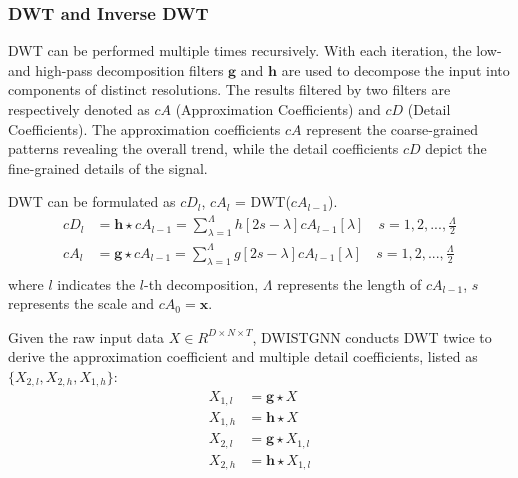\documentclass[final,12pt]{elsarticle}
\begin{document}
\subsubsection{DWT and Inverse DWT}
\label{subsubsec-4.2.1}


DWT can be performed multiple times recursively.
With each iteration, 
the low- and high-pass decomposition filters $\textbf{g}$ and $\textbf{h}$ 
are used to decompose the input  
into components of distinct resolutions.  %
The results filtered by two filters are respectively denoted as 
$cA$ (Approximation Coefficients) and 
$cD$ (Detail Coefficients).  %
The approximation coefficients $cA$ 
represent the coarse-grained patterns revealing the overall trend, 
while the detail coefficients $cD$ 
depict the fine-grained details of the signal.  %

DWT can be formulated as $cD_{l}$, $cA_{l}$ = DWT($cA_{l-1}$).
\begin{equation}
  \begin{aligned}
    cD_{l} &= \textbf{h} \star cA_{l-1}
            = \sum_{\lambda=1}^{\Lambda} h[2s-\lambda] cA_{l-1}[\lambda] 
              \quad s = 1, 2, ..., \frac{\Lambda}{2}  \\
    cA_{l} &= \textbf{g} \star cA_{l-1}
            = \sum_{\lambda=1}^{\Lambda} g[2s-\lambda] cA_{l-1}[\lambda] 
              \quad s = 1, 2, ..., \frac{\Lambda}{2}  \\
  \end{aligned}
\end{equation}
where $l$ indicates the $l$-th decomposition, 
$\Lambda$ represents the length of $cA_{l-1}$, 
$s$ represents the scale and $cA_{0} = \textbf{x}$.  %

Given the raw input data $X \in R^{D \times N \times T}$, 
DWISTGNN conducts DWT twice 
to derive the approximation coefficient and multiple detail coefficients, 
listed as $\{X_{2, l}, X_{2, h}, X_{1, h}\}$: 
\begin{equation}
  \begin{aligned}
    X_{1, l} &= \textbf{g} \star X  \\
    X_{1, h} &= \textbf{h} \star X  \\
    X_{2, l} &= \textbf{g} \star X_{1, l}  \\
    X_{2, h} &= \textbf{h} \star X_{1, l}  \\
  \end{aligned}
\end{equation}  %
\end{document}
